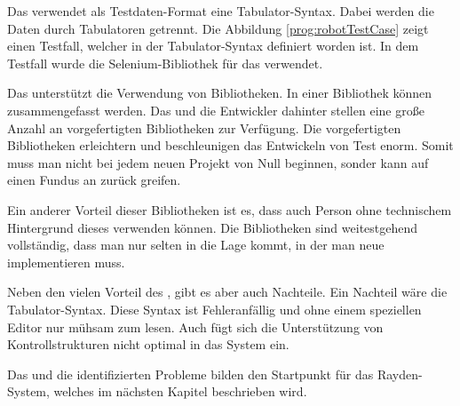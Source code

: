 \SuperPar
Das  verwendet als Testdaten-Format eine Tabulator-Syntax. Dabei werden die Daten durch Tabulatoren getrennt. Die Abbildung \ref{prog:robotTestCase} zeigt einen Testfall, welcher in der Tabulator-Syntax definiert worden ist. In dem Testfall wurde die Selenium-Bibliothek für das  verwendet. 

\SuperPar
Das  unterstützt die Verwendung von Bibliotheken. In einer Bibliothek können  zusammengefasst werden. Das  und die Entwickler dahinter stellen eine große Anzahl an vorgefertigten Bibliotheken zur Verfügung. Die vorgefertigten Bibliotheken erleichtern und beschleunigen das Entwickeln von Test enorm. Somit muss man nicht bei jedem neuen Projekt von Null beginnen, sonder kann auf einen Fundus an  zurück greifen.

\SuperPar
Ein anderer Vorteil dieser Bibliotheken ist es, dass auch Person ohne technischem Hintergrund dieses  verwenden können. Die Bibliotheken sind weitestgehend vollständig, dass man nur selten in die Lage kommt, in der man neue  implementieren muss.

\SuperPar
Neben den vielen Vorteil des , gibt es aber auch Nachteile. Ein Nachteil wäre die Tabulator-Syntax. Diese Syntax ist Fehleranfällig und ohne einem speziellen Editor nur mühsam zum lesen. Auch fügt sich die Unterstützung von Kontrollstrukturen nicht optimal in das System ein.

\SuperPar
Das  und die identifizierten Probleme bilden den Startpunkt für das Rayden-System, welches im nächsten Kapitel beschrieben wird.

